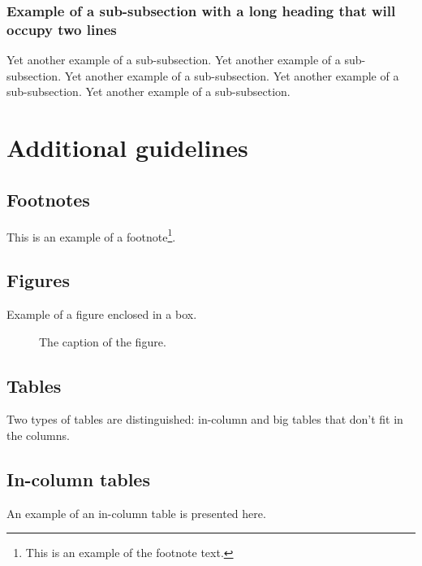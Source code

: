 \documentclass[10pt, a4paper]{article}
\begin{document}
\subsubsection{Example of a sub-subsection with a long heading that will occupy two lines}

Yet another example of a sub-subsection. Yet another example of a sub-subsection. Yet another example of a sub-subsection. Yet another example of a sub-subsection. Yet another example of a sub-subsection. 

\section{Additional guidelines}

\subsection{Footnotes}

This is an example of a footnote\footnote{This is an example of the footnote text.}.


\subsection{Figures}


Example of a figure enclosed in a box.


\begin{figure}[h]
\begin{center}
\caption{The caption of the figure.}
\end{center}
\end{figure}

\subsection{Tables}

Two types of tables are distinguished: in-column and big tables that don't fit in the columns.


\subsection{In-column tables}


An example of an in-column table is presented here.
\end{document}
